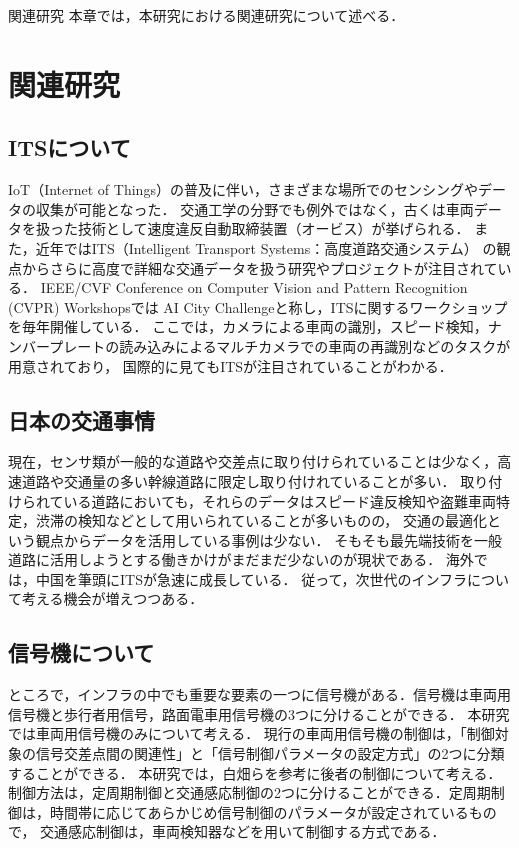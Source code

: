 \chapterhead
{関連研究}
{本章では，本研究における関連研究について述べる．}

\section{関連研究}
\subsection{ITSについて}
IoT（Internet of Things）の普及に伴い，さまざまな場所でのセンシングやデータの収集が可能となった．
交通工学の分野でも例外ではなく，古くは車両データを扱った技術として速度違反自動取締装置（オービス）が挙げられる．
また，近年ではITS（Intelligent Transport Systems：高度道路交通システム）
の観点からさらに高度で詳細な交通データを扱う研究やプロジェクトが注目されている．
IEEE/CVF Conference on Computer Vision and Pattern Recognition (CVPR) Workshopsでは
AI City Challenge\cite{Naphade_2020_CVPR_Workshops}と称し，ITSに関するワークショップを毎年開催している．
ここでは，カメラによる車両の識別，スピード検知，ナンバープレートの読み込みによるマルチカメラでの車両の再識別などのタスクが用意されており，
国際的に見てもITSが注目されていることがわかる．

\subsection{日本の交通事情}
現在，センサ類が一般的な道路や交差点に取り付けられていることは少なく，高速道路や交通量の多い幹線道路に限定し取り付けれていることが多い．
取り付けられている道路においても，それらのデータはスピード違反検知や盗難車両特定，渋滞の検知などとして用いられていることが多いものの，
交通の最適化という観点からデータを活用している事例は少ない．
そもそも最先端技術を一般道路に活用しようとする働きかけがまだまだ少ないのが現状である．
海外では，中国を筆頭にITSが急速に成長している．%
従って，次世代のインフラについて考える機会が増えつつある．

\subsection{信号機について}
ところで，インフラの中でも重要な要素の一つに信号機がある．信号機は車両用信号機と歩行者用信号，路面電車用信号機の3つに分けることができる．
本研究では車両用信号機のみについて考える．
現行の車両用信号機の制御は，「制御対象の信号交差点間の関連性」と「信号制御パラメータの設定方式」の2つに分類することができる．
本研究では，白畑ら\cite{shirahata}を参考に後者の制御について考える．
制御方法は，定周期制御と交通感応制御の2つに分けることができる．定周期制御は，時間帯に応じてあらかじめ信号制御のパラメータが設定されているもので，
交通感応制御は，車両検知器などを用いて制御する方式である．

